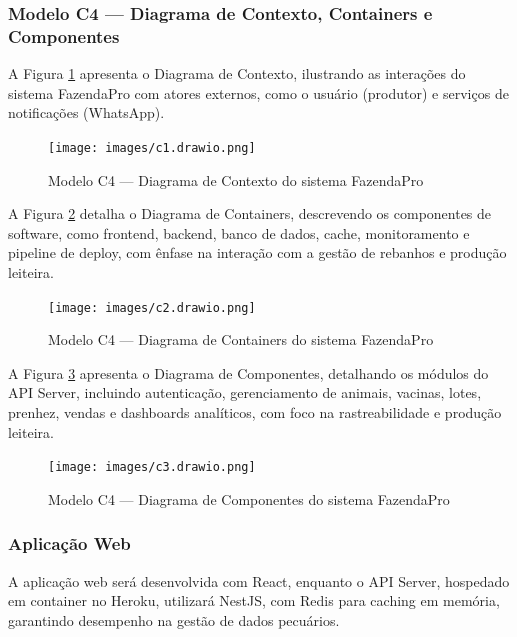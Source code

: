 \documentclass[12pt, a4paper]{article}
\begin{document}
\subsubsection{Modelo C4 — Diagrama de Contexto, Containers e Componentes}
\begin{spacing}{1.5}
A Figura \ref{fig:C4-Contexto} apresenta o Diagrama de Contexto, ilustrando as interações do sistema FazendaPro com atores externos, como o usuário (produtor) e serviços de notificações (WhatsApp).

\begin{figure}[H]
    \centering
    \texttt{[image: images/c1.drawio.png]}
    \caption{Modelo C4 — Diagrama de Contexto do sistema FazendaPro}
    \label{fig:C4-Contexto}
\end{figure}

\vspace{0.5cm}

A Figura \ref{fig:C4-Containers} detalha o Diagrama de Containers, descrevendo os componentes de software, como frontend, backend, banco de dados, cache, monitoramento e pipeline de deploy, com ênfase na interação com a gestão de rebanhos e produção leiteira.

\begin{figure}[H]
    \centering
    \texttt{[image: images/c2.drawio.png]}
    \caption{Modelo C4 — Diagrama de Containers do sistema FazendaPro}
    \label{fig:C4-Containers}
\end{figure}

\vspace{0.5cm}

A Figura \ref{fig:C4-Componentes} apresenta o Diagrama de Componentes, detalhando os módulos do API Server, incluindo autenticação, gerenciamento de animais, vacinas, lotes, prenhez, vendas e dashboards analíticos, com foco na rastreabilidade e produção leiteira.

\begin{figure}[H]
    \centering
    \texttt{[image: images/c3.drawio.png]}
    \caption{Modelo C4 — Diagrama de Componentes do sistema FazendaPro}
    \label{fig:C4-Componentes}
\end{figure}
\end{spacing}

\subsubsection{Aplicação Web}
\begin{spacing}{1.5}
A aplicação web será desenvolvida com React, enquanto o API Server, hospedado em container no Heroku, utilizará NestJS, com Redis para caching em memória, garantindo desempenho na gestão de dados pecuários.
\end{spacing}
\end{document}

